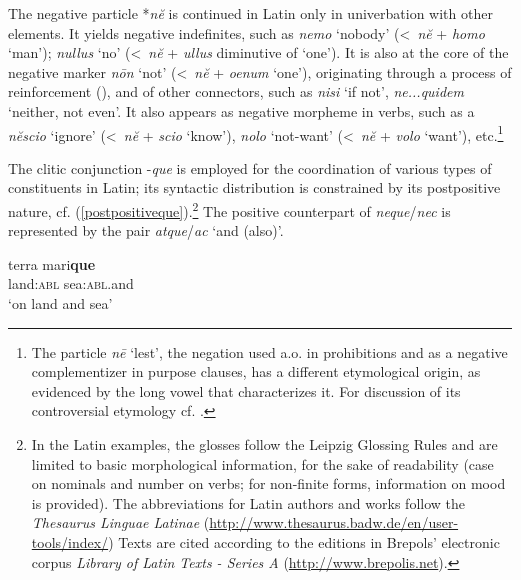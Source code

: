 \documentclass[output=paper,modfonts,nonflat,citecolor=brown,
showindex
]{langsci/langscibook}
\begin{document}
The negative particle *{\emph{n\u{e}}} is continued in Latin only in univerbation with other elements. It yields negative indefinites, such as {\emph{nemo}} `nobody' (\textless \ {\emph{n\u{e}}} + {\emph{homo}} `man'); {\emph{nullus}} `no' (\textless \ {\emph{n\u{e}}} + {\emph{ullus}} diminutive of `one'). It is also at the core of the negative marker {\emph{n\=on}} `not' (\textless \ {\emph{n\u{e}}} + {\emph{oenum}} `one'), originating through a process of reinforcement (\citealt[]{Fruyt08a, Gianollo18}), and of other connectors, such as {\emph{nisi}} `if not', {\emph{ne...quidem}} `neither, not even'. It also appears as negative morpheme in verbs, such as a {\emph{n\u{e}scio}} `ignore' (\textless \ {\emph{n\u{e}}} + {\emph{scio}} `know'), {\emph{nolo}} `not-want' (\textless \ {\emph{n\u{e}}} + {\emph{volo}} `want'), etc.{\footnote{The particle {\emph{n\=e}} `lest', the negation used a.o. in prohibitions and as a negative complementizer in purpose clauses, has a different etymological origin, as evidenced by the long vowel that characterizes it. For discussion of its controversial etymology cf. \citet{deVaan}.}}

The clitic conjunction -{\emph{que}} is employed for the coordination of various types of constituents in Latin; its syntactic distribution is constrained by its postpositive nature, cf. (\ref{postpositiveque}).{\footnote{In the Latin examples, the glosses follow the Leipzig Glossing Rules and are limited to basic morphological information, for the sake of readability (case on nominals and number on verbs; for non-finite forms, information on mood is provided). The abbreviations for Latin authors and works follow the {\emph{Thesaurus Linguae Latinae}} (\url{http://www.thesaurus.badw.de/en/user-tools/index/}) Texts are cited according to the editions in Brepols' electronic corpus {\emph{Library of Latin Texts - Series A}} (\url{http://www.brepolis.net}).}} The positive counterpart of {\emph{neque}}\slash{\emph{nec}} is represented by the pair {\emph{atque}}/{\emph{ac}} `and (also)'.

{\begin{exe}
\ex \label{postpositiveque} \gll terra mari{\textbf{que}}\\
\linebreak land:{\textsc{abl}} sea:{\textsc{abl}}.and\\
\linebreak \hfill `on land and sea'\\
\end{exe}}
\end{document}
